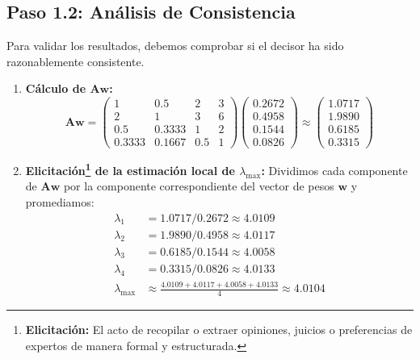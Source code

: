 \documentclass[11pt, letterpaper]{article}
\begin{document}
\subsection{Paso 1.2: Análisis de Consistencia}
Para validar los resultados, debemos comprobar si el decisor ha sido razonablemente consistente.
\begin{enumerate}
    \item \textbf{Cálculo de $\mathbf{A}\mathbf{w}$:}
    \begin{equation*}
        \mathbf{A}\mathbf{w} = \begin{pmatrix}
            1 & 0.5 & 2 & 3 \\
            2 & 1 & 3 & 6 \\
            0.5 & 0.3333 & 1 & 2 \\
            0.3333 & 0.1667 & 0.5 & 1
        \end{pmatrix} \begin{pmatrix} 0.2672 \\ 0.4958 \\ 0.1544 \\ 0.0826 \end{pmatrix} \approx \begin{pmatrix} 1.0717 \\ 1.9890 \\ 0.6185 \\ 0.3315 \end{pmatrix}
    \end{equation*}
    
    \item \textbf{Elicitación\footnote{\textbf{Elicitación:} El acto de recopilar o extraer opiniones, juicios o preferencias de expertos de manera formal y estructurada.} de la estimación local de $\lambda_{\max}$:}
    Dividimos cada componente de $\mathbf{A}\mathbf{w}$ por la componente correspondiente del vector de pesos $\mathbf{w}$ y promediamos:
    \begin{align*}
        \lambda_{1} &= 1.0717 / 0.2672 \approx 4.0109 \\
        \lambda_{2} &= 1.9890 / 0.4958 \approx 4.0117 \\
        \lambda_{3} &= 0.6185 / 0.1544 \approx 4.0058 \\
        \lambda_{4} &= 0.3315 / 0.0826 \approx 4.0133 \\
        \lambda_{\max} &\approx \frac{4.0109 + 4.0117 + 4.0058 + 4.0133}{4} \approx \mathbf{4.0104}
    \end{align*}
    

\end{enumerate}
\end{document}
